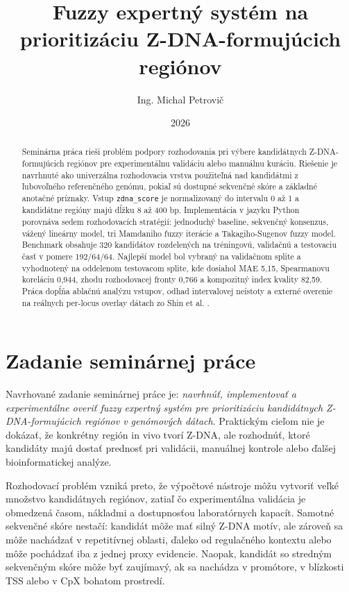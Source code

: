 \documentclass[12pt,a4paper]{article}
\title{Fuzzy expertný systém na prioritizáciu Z-DNA-formujúcich regiónov}
\author{Ing. Michal Petrovič}
\date{2026}
\begin{document}
\maketitle

\begin{abstract}
Seminárna práca rieši problém podpory rozhodovania pri výbere kandidátnych Z-DNA-formujúcich regiónov pre experimentálnu validáciu alebo manuálnu kuráciu. Riešenie je navrhnuté ako univerzálna rozhodovacia vrstva použiteľná nad kandidátmi z ľubovoľného referenčného genómu, pokiaľ sú dostupné sekvenčné skóre a základné anotačné príznaky. Vstup \texttt{zdna\_score} je normalizovaný do intervalu 0 až 1 a kandidátne regióny majú dĺžku 8 až 400 bp. Implementácia v jazyku Python porovnáva sedem rozhodovacích stratégií: jednoduchý baseline, sekvenčný konsenzus, vážený lineárny model, tri Mamdaniho fuzzy iterácie a Takagiho-Sugenov fuzzy model. Benchmark obsahuje 320 kandidátov rozdelených na tréningovú, validačnú a testovaciu časť v pomere 192/64/64. Najlepší model bol vybraný na validačnom splite a vyhodnotený na oddelenom testovacom splite, kde dosiahol MAE 5,15, Spearmanovu koreláciu 0,944, zhodu rozhodovacej fronty 0,766 a kompozitný index kvality 82,59. Práca dopĺňa ablačnú analýzu vstupov, odhad intervalovej neistoty a externé overenie na reálnych per-locus overlay dátach zo Shin et al. \citep{shin2016}.
\end{abstract}

\section{Zadanie seminárnej práce}

Navrhované zadanie seminárnej práce je: \emph{navrhnúť, implementovať a experimentálne overiť fuzzy expertný systém pre prioritizáciu kandidátnych Z-DNA-formujúcich regiónov v genómových dátach}. Praktickým cieľom nie je dokázať, že konkrétny región in vivo tvorí Z-DNA, ale rozhodnúť, ktoré kandidáty majú dostať prednosť pri validácii, manuálnej kontrole alebo ďalšej bioinformatickej analýze.

Rozhodovací problém vzniká preto, že výpočtové nástroje môžu vytvoriť veľké množstvo kandidátnych regiónov, zatiaľ čo experimentálna validácia je obmedzená časom, nákladmi a dostupnosťou laboratórnych kapacít. Samotné sekvenčné skóre nestačí: kandidát môže mať silný Z-DNA motív, ale zároveň sa môže nachádzať v repetitívnej oblasti, ďaleko od regulačného kontextu alebo môže pochádzať iba z jednej proxy evidencie. Naopak, kandidát so stredným sekvenčným skóre môže byť zaujímavý, ak sa nachádza v promótore, v blízkosti TSS alebo v CpX bohatom prostredí.
\end{document}
